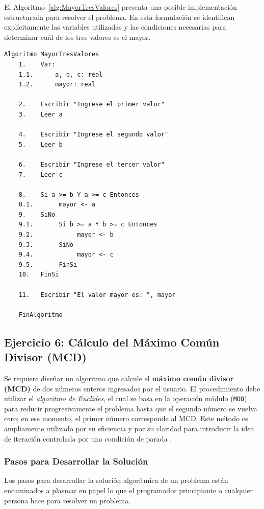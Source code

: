 \documentclass[12pt,twoside]{book}
\begin{document}
						\noindent
						El Algoritmo~\ref{alg:MayorTresValores} presenta una posible implementación estructurada para resolver el problema. En esta formulación se identifican explícitamente las variables utilizadas y las condiciones necesarias para determinar cuál de los tres valores es el mayor.
						
						\begin{lstlisting}[style=upsamStyle,caption={Determinación del valor mayor entre tres números},label={alg:MayorTresValores}]
	Algoritmo MayorTresValores
	1.    Var:
	1.1.      a, b, c: real
	1.2.      mayor: real
	
	2.    Escribir "Ingrese el primer valor"
	3.    Leer a
	
	4.    Escribir "Ingrese el segundo valor"
	5.    Leer b
	
	6.    Escribir "Ingrese el tercer valor"
	7.    Leer c
	
	8.    Si a >= b Y a >= c Entonces
	8.1.       mayor <- a
	9.    SiNo
	9.1.       Si b >= a Y b >= c Entonces
	9.2.            mayor <- b
	9.3.       SiNo
	9.4.            mayor <- c
	9.5.       FinSi
	10.   FinSi
	
	11.   Escribir "El valor mayor es: ", mayor
	
	FinAlgoritmo \end{lstlisting}
						
						
				\subsection{Ejercicio 6: Cálculo del Máximo Común Divisor (MCD)}
					\noindent
					Se requiere diseñar un algoritmo que calcule el \textbf{máximo común divisor (MCD)} de dos números enteros ingresados por el usuario. El procedimiento debe utilizar el \emph{algoritmo de Euclides}, el cual se basa en la operación módulo (\texttt{MOD}) para reducir progresivamente el problema hasta que el segundo número se vuelva cero; en ese momento, el primer número corresponde al MCD. Este método es ampliamente utilizado por su eficiencia y por su claridad para introducir la idea de iteración controlada por una condición de parada \cite{Cormen2022Introduction,Sebesta2018Concepts}.
						
					\subsubsection{Pasos para Desarrollar la Solución}
						Los pasos para desarrollar la solución algorítmica de un problema están encaminados a plasmar en papel lo que el programador principiante o cualquier persona hace para resolver un problema.
						
\end{document}
